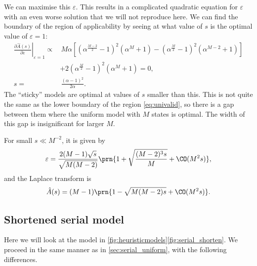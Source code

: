 \documentclass[12pt]{article}
\renewcommand{\pdiff}[2]{\frac{\partial #1}{\partial #2}}
\begin{document}
We can maximise this \wrt $\varepsilon$.
This results in a complicated quadratic equation for $\varepsilon$ with an even worse solution that we will not reproduce here.
We can find the boundary of the region of applicability by seeing at what value of $s$ is the optimal value of $\varepsilon=1$:
%
\begin{equation}\label{eq:stickyvalid}
\begin{aligned}
  \left.\pdiff{\hat{A}(s)}{\varepsilon}\right|_{\varepsilon=1} \propto &\,
    M\alpha[(\alpha^{\frac{M-2}{2}}-1)^2(\alpha^M+1) - (\alpha^{\frac{M}{2}}-1)^2(\alpha^{M-2}+1)]
     \\ &+ 2(\alpha^{\frac{M}{2}}-1)^2(\alpha^M+1) = 0,\\
    s = &\, \frac{(\alpha-1)^2}{2\alpha}.
\end{aligned}
\end{equation}
%
The ``sticky'' models are optimal at values of $s$ smaller than this.
This is not quite the same as the lower boundary of the region \eqref{eq:univalid}, so there is a gap between them where the uniform model with $M$ states is optimal.
The width of this gap is insignificant for larger $M$.

For small $s \ll M^{-2}$, it is given by
%
\begin{equation}\label{eq:stickyeps}
  \varepsilon = \frac{ 2(M-1)\sqrt{s} }{\sqrt{M(M-2)}} \prn{ 1 + \sqrt{\frac{(M-2)^3s}{M}} + \CO(M^2s)},
\end{equation}
%
and the Laplace transform is
%
\begin{equation}\label{eq:stickyenv}
  \hat{A}(s) = (M-1) \prn{ 1 - \sqrt{M(M-2)s} + \CO(M^2s)}.
\end{equation}
%



\subsection{Shortened serial model}\label{sec:serial_shorten}


Here we will look at the model in \autoref{fig:heuristicmodels}\ref{fig:serial_shorten}.
We proceed in the same manner as in \autoref{sec:serial_uniform}, with the following differences.
\end{document}
